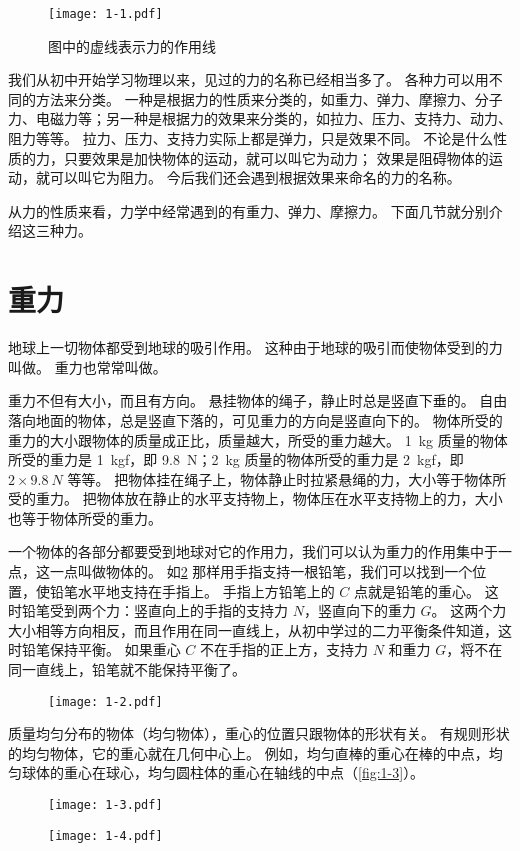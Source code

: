 \begin{figure}
\texttt{[image: 1-1.pdf]}
\caption{图中的虚线表示力的作用线}\label{fig:1-1}
\end{figure}

我们从初中开始学习物理以来，见过的力的名称已经相当多了。
各种力可以用不同的方法来分类。
一种是根据力的性质来分类的，如重力、弹力、摩擦力、分子力、电磁力等；另一种是根据力的效果来分类的，如拉力、压力、支持力、动力、阻力等等。
拉力、压力、支持力实际上都是弹力，只是效果不同。
不论是什么性质的力，只要效果是加快物体的运动，就可以叫它为动力；
效果是阻碍物体的运动，就可以叫它为阻力。
今后我们还会遇到根据效果来命名的力的名称。

从力的性质来看，力学中经常遇到的有重力、弹力、摩擦力。
下面几节就分别介绍这三种力。

\section{重力}
地球上一切物体都受到地球的吸引作用。
这种由于地球的吸引而使物体受到的力叫做。
重力也常常叫做。

重力不但有大小，而且有方向。
悬挂物体的绳子，静止时总是竖直下垂的。
自由落向地面的物体，总是竖直下落的，可见重力的方向是竖直向下的。
物体所受的重力的大小跟物体的质量成正比，质量越大，所受的重力越大。
\qty{1}{kg} 质量的物体所受的重力是 \qty{1}{kgf}，即 \qty{9.8}{N}；\qty{2}{kg} 质量的物体所受的重力是 \qty{2}{kgf}，即 $2\times \qty{9.8}{N}$ 等等。
把物体挂在绳子上，物体静止时拉紧悬绳的力，大小等于物体所受的重力。
把物体放在静止的水平支持物上，物体压在水平支持物上的力，大小也等于物体所受的重力。

一个物体的各部分都要受到地球对它的作用力，我们可以认为重力的作用集中于一点，这一点叫做物体的。
如\cref{fig:1-2} 那样用手指支持一根铅笔，我们可以找到一个位置，使铅笔水平地支持在手指上。
手指上方铅笔上的 $C$ 点就是铅笔的重心。
这时铅笔受到两个力：竖直向上的手指的支持力 $N$，竖直向下的重力 $G$。
这两个力大小相等方向相反，而且作用在同一直线上，从初中学过的二力平衡条件知道，这时铅笔保持平衡。
如果重心 $C$ 不在手指的正上方，支持力 $N$ 和重力 $G$，将不在同一直线上，铅笔就不能保持平衡了。
\begin{figure}
  \texttt{[image: 1-2.pdf]}
  \caption{}\label{fig:1-2}
\end{figure}

质量均匀分布的物体（均匀物体），重心的位置只跟物体的形状有关。
有规则形状的均匀物体，它的重心就在几何中心上。
例如，均匀直棒的重心在棒的中点，均匀球体的重心在球心，均匀圆柱体的重心在轴线的中点（\cref{fig:1-3}）。
\begin{figure}
  \begin{minipage}[b]{0.48\linewidth}\centering
    \texttt{[image: 1-3.pdf]}
    \caption{}\label{fig:1-3}
  \end{minipage}
  \begin{minipage}[b]{0.48\linewidth}\centering
    \texttt{[image: 1-4.pdf]}
    \caption{}\label{fig:1-4}
  \end{minipage}
\end{figure}


